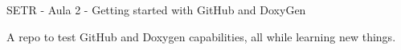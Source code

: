 S\+E\+TR -\/ Aula 2 -\/ Getting started with Git\+Hub and Doxy\+Gen

A repo to test Git\+Hub and Doxygen capabilities, all while learning new things. 